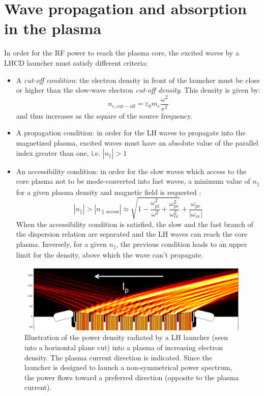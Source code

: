 \section{Wave propagation and absorption in the plasma}
In order for the RF power to reach the plasma core, the excited waves by a LHCD launcher must satisfy different criteria: 

\begin{itemize}
\item  A \emph{cut-off condition}: the electron density in front of the launcher must be close or higher than the slow-wave electron \emph{cut-off density}. This density is given by:
$$
n_{c,\mathrm{cut-off}} = \varepsilon_0 m_e \frac{\omega^2}{e^2}
$$
and thus increases as the square of the source frequency. 
\item A propagation condition: in order for the LH waves to propagate into the magnetized plasma, excited waves must have an absolute value of the parallel index greater than one, i.e. $|n_{\parallel}|>1$ 
\item An accessibility condition: in order for the slow waves which access to the core plasma not to be mode-converted into fast waves, a minimum value of $n_{\parallel}$ for a given plasma density and magnetic field is requested :
$$
|n_{\parallel} |>| n_{\parallel \mathrm{access}} | 
\approx 
\sqrt{1 
	- \frac{\omega_{pi}^2}{\omega^2} 
	+ \frac{\omega_{pe}^2}{\omega_{ce}^2}}
+ \frac{\omega_{pe} }{| \omega_{ce} |}
$$ 
When the accessibility condition is satisfied, the slow and the fast branch of the dispersion relation are separated and the LH waves can reach the core plasma.
Inversely, for a given $n_{\parallel}$, the previous condition leads to an upper limit for the density, above which the wave can’t propagate.
\end{itemize}

\begin{figure}
\centering
\includegraphics[width=0.9\linewidth]{Figures/LHCD/C3_powerflow}
\caption{Illustration of the power density radiated by a LH launcher (seen into a horizontal plane cut) into a plasma of increasing electron density. The plasma current direction is indicated. Since the launcher is designed to launch a non-symmetrical power spectrum, the power flows toward a preferred direction (opposite to the plasma current).}
\label{fig:c3powerflow}
\end{figure}



